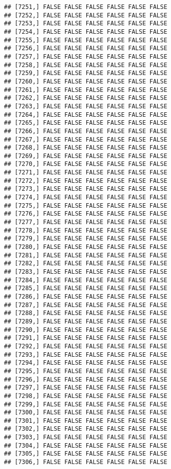 \documentclass[
]{article}
\begin{document}
\begin{verbatim}
## [7251,] FALSE FALSE FALSE FALSE FALSE FALSE
## [7252,] FALSE FALSE FALSE FALSE FALSE FALSE
## [7253,] FALSE FALSE FALSE FALSE FALSE FALSE
## [7254,] FALSE FALSE FALSE FALSE FALSE FALSE
## [7255,] FALSE FALSE FALSE FALSE FALSE FALSE
## [7256,] FALSE FALSE FALSE FALSE FALSE FALSE
## [7257,] FALSE FALSE FALSE FALSE FALSE FALSE
## [7258,] FALSE FALSE FALSE FALSE FALSE FALSE
## [7259,] FALSE FALSE FALSE FALSE FALSE FALSE
## [7260,] FALSE FALSE FALSE FALSE FALSE FALSE
## [7261,] FALSE FALSE FALSE FALSE FALSE FALSE
## [7262,] FALSE FALSE FALSE FALSE FALSE FALSE
## [7263,] FALSE FALSE FALSE FALSE FALSE FALSE
## [7264,] FALSE FALSE FALSE FALSE FALSE FALSE
## [7265,] FALSE FALSE FALSE FALSE FALSE FALSE
## [7266,] FALSE FALSE FALSE FALSE FALSE FALSE
## [7267,] FALSE FALSE FALSE FALSE FALSE FALSE
## [7268,] FALSE FALSE FALSE FALSE FALSE FALSE
## [7269,] FALSE FALSE FALSE FALSE FALSE FALSE
## [7270,] FALSE FALSE FALSE FALSE FALSE FALSE
## [7271,] FALSE FALSE FALSE FALSE FALSE FALSE
## [7272,] FALSE FALSE FALSE FALSE FALSE FALSE
## [7273,] FALSE FALSE FALSE FALSE FALSE FALSE
## [7274,] FALSE FALSE FALSE FALSE FALSE FALSE
## [7275,] FALSE FALSE FALSE FALSE FALSE FALSE
## [7276,] FALSE FALSE FALSE FALSE FALSE FALSE
## [7277,] FALSE FALSE FALSE FALSE FALSE FALSE
## [7278,] FALSE FALSE FALSE FALSE FALSE FALSE
## [7279,] FALSE FALSE FALSE FALSE FALSE FALSE
## [7280,] FALSE FALSE FALSE FALSE FALSE FALSE
## [7281,] FALSE FALSE FALSE FALSE FALSE FALSE
## [7282,] FALSE FALSE FALSE FALSE FALSE FALSE
## [7283,] FALSE FALSE FALSE FALSE FALSE FALSE
## [7284,] FALSE FALSE FALSE FALSE FALSE FALSE
## [7285,] FALSE FALSE FALSE FALSE FALSE FALSE
## [7286,] FALSE FALSE FALSE FALSE FALSE FALSE
## [7287,] FALSE FALSE FALSE FALSE FALSE FALSE
## [7288,] FALSE FALSE FALSE FALSE FALSE FALSE
## [7289,] FALSE FALSE FALSE FALSE FALSE FALSE
## [7290,] FALSE FALSE FALSE FALSE FALSE FALSE
## [7291,] FALSE FALSE FALSE FALSE FALSE FALSE
## [7292,] FALSE FALSE FALSE FALSE FALSE FALSE
## [7293,] FALSE FALSE FALSE FALSE FALSE FALSE
## [7294,] FALSE FALSE FALSE FALSE FALSE FALSE
## [7295,] FALSE FALSE FALSE FALSE FALSE FALSE
## [7296,] FALSE FALSE FALSE FALSE FALSE FALSE
## [7297,] FALSE FALSE FALSE FALSE FALSE FALSE
## [7298,] FALSE FALSE FALSE FALSE FALSE FALSE
## [7299,] FALSE FALSE FALSE FALSE FALSE FALSE
## [7300,] FALSE FALSE FALSE FALSE FALSE FALSE
## [7301,] FALSE FALSE FALSE FALSE FALSE FALSE
## [7302,] FALSE FALSE FALSE FALSE FALSE FALSE
## [7303,] FALSE FALSE FALSE FALSE FALSE FALSE
## [7304,] FALSE FALSE FALSE FALSE FALSE FALSE
## [7305,] FALSE FALSE FALSE FALSE FALSE FALSE
## [7306,] FALSE FALSE FALSE FALSE FALSE FALSE

\end{verbatim}
\end{document}
